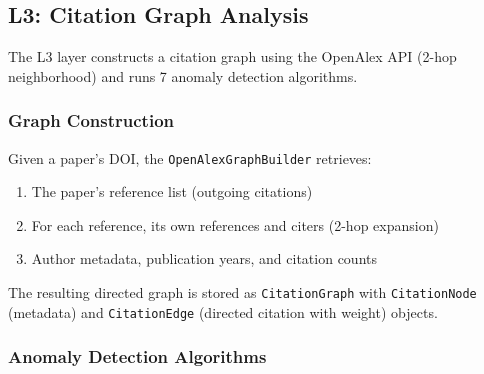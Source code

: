 \documentclass[sigconf,nonacm]{acmart}
\begin{document}
\subsection{L3: Citation Graph Analysis}
\label{sec:l3}

The L3 layer constructs a citation graph using the OpenAlex API (2-hop neighborhood) and runs 7 anomaly detection algorithms.

\subsubsection{Graph Construction}

Given a paper's DOI, the \texttt{OpenAlexGraphBuilder} retrieves:
\begin{enumerate}
    \item The paper's reference list (outgoing citations)
    \item For each reference, its own references and citers (2-hop expansion)
    \item Author metadata, publication years, and citation counts
\end{enumerate}

The resulting directed graph is stored as \texttt{CitationGraph} with \texttt{CitationNode} (metadata) and \texttt{CitationEdge} (directed citation with weight) objects.

\subsubsection{Anomaly Detection Algorithms}
\end{document}
